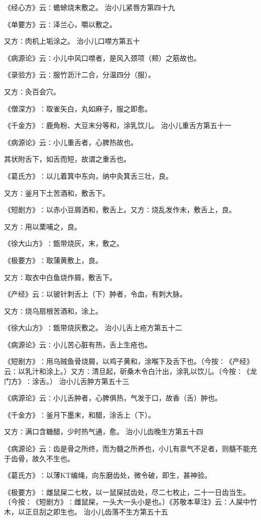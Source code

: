 \documentclass[a4paper,12pt,UTF8,twoside]{ctexbook}
\begin{document}
《经心方》云∶蟾蜍烧末敷之。
治小儿紧唇方第四十九

《单要方》云∶泽兰心，嚼以敷之。

又方∶肉机上垢涂之。
治小儿口噤方第五十

《病源论》云∶小儿中风口噤者，是风入颈项（颊）之筋故也。

《录验方》云∶服竹沥汁二合，分温四分（服）。

又方∶灸百会穴。

《僧深方》∶取雀矢白，丸如麻子，服之即愈。

《千金方》∶鹿角粉、大豆末分等和，涂乳饮儿。
治小儿重舌方第五十一

《病源论》云∶小儿重舌者，心脾热故也。

其状附舌下，如舌而短，故谓之重舌也。

《葛氏方》∶以儿着箕中东向，纳中灸箕舌三壮，良。

又方∶釜月下土苦酒和，敷舌下。

《短剧方》∶以赤小豆屑洒和，敷舌上。又方∶烧乱发作未，敷舌上，良。

又方∶用以栗哺之，良。

《徐大山方》∶甑带烧灰，末，敷之。

《极要方》∶取蒲黄敷上，良。

又方∶取衣中白鱼烧作屑，敷舌下。

《产经》云∶以铍针刺舌上（下）肿者，令血，有刺大脉。

又方∶烧乌扇根苦酒和，涂上。

《徐大山方》∶甑带烧灰敷之。
治小儿舌上疮方第五十二

《病源论》云∶小儿苦心脏有热，舌上生疮也。

《短剧方》∶用乌贼鱼骨烧屑，以鸡子黄和，涂喉下及舌下也。（今按∶《产经》云∶以乳汁和涂上。）又方∶清旦起，斫桑木令白汁出，涂乳以饮儿。（今按∶《龙门方》∶涂舌。）
治小儿舌肿方第五十三

《病源论》云∶小儿舌肿者，心脾俱热，气发于口，故香（舌）肿也。

《千金方》∶釜月下墨末，和醋，涂舌上（下）。

又方∶满口含糖醋，少时热气通，愈。
治小儿齿晚生方第五十四

《病源论》云∶齿是骨之所终，而为髓之所养也，小儿有禀气不足者，则髓不能充于齿骨，故久不生也。

《葛氏方》∶以薄KT编绳，向东磨齿处，微令破，即生，甚神验。

《极要方》∶雌鼠屎二七枚，以一鼠屎拭齿处，尽二七枚止，二十一日齿当生。（今按∶《短剧方》∶雌鼠屎，一头大一头小是也。）《苏敬本草注》云∶人屎中竹木，以正旦刮之即生也。
治小儿齿落不生方第五十五
\end{document}
